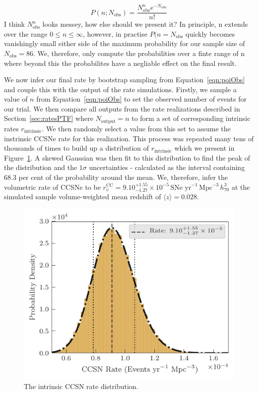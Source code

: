 \documentclass[a4paper,fleqn,usenatbib]{mnras}
\newcommand{\chris}[1]{\color{orange}#1\color{black}}
\begin{document}
\begin{equation}
    P(n; N_\mathrm{obs})=\frac{N_\mathrm{obs}^{n} e^{-N_\mathrm{obs}}}{n!}
    \label{eqn:poiObs}
\end{equation}
\chris{I think $N_\mathrm{obs}^{n}$ looks messey, how else should we present it?}
In principle, n extends over the range $0 \le n \le \infty$, however, in practise $P(n=N_\mathrm{obs}$ quickly becomes vanishingly small either side of the maximum probability for our sample size of $N_\mathrm{obs}=86$. We, therefore, only compute the probabilities over a finte range of n where beyond this the probabilites have a negliable effect on the final result.

We now infer our final rate by bootstrap sampling from Equation~\ref{eqn:poiObs} and couple this with the output of the rate simulations. Firstly, we sample a value of $n$ from Equation~\ref{eqn:poiObs} to set the observed number of events for our trial. We then compare all outputs from the rate realizations described in Section~\ref{sec:ratesPTF} where $N_\mathrm{output} =  n$ to form a set of corresponding intrinsic rates $r_\mathrm{intrinsic}$. We then randomly select a value from this set to assume the instrinsic CCSNe rate for this realization. This process was repeated many tens of thousands of times to build up a distribution of $r_\mathrm{intrinsic}$ which we present in Figure~\ref{fig:ccRateDist}. A skewed Gaussian was then fit to this distribution to find the peak of the distribution and the $1\sigma$ uncertainties - calculated as the interval containing 68.3 per cent of the probability around the mean. We, therefore, infer the volumetric rate of CCSNe to be $r^\mathrm{CC}_v=9.10_{-1.27}^{+1.55}\times10^{-5}\,\text{SNe yr}^{-1}\,\text{Mpc}^{-3}\, h_{70}^{3}$ at the simulated sample volume-weighted mean redshift of $ \langle z \rangle = 0.028$.

\begin{figure}
	\includegraphics[width=\linewidth]{./allCC_Rate.pdf}
    \caption{The intrinsic CCSN rate distribution.}
    \label{fig:ccRateDist}
\end{figure}
\end{document}
